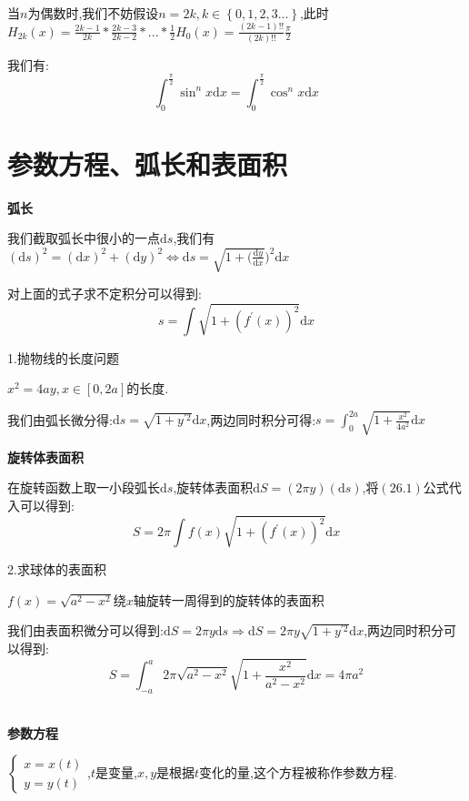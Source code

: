 \documentclass[oneside]{book}
\begin{document}
	\hspace{\fill}\
	
	当$n$为偶数时,我们不妨假设$n=2k,k\in\left\lbrace 0,1,2,3...\right\rbrace $,此时$H_{2k}(x)=\frac{2k-1}{2k}*\frac{2k-3}{2k-2}*...*\frac{1}{2}H_{0}(x)=\frac{(2k-1)!!}{(2k)!!}\frac{\pi}{2}$
	
	我们有:$$\int_{0}^{\frac{\pi}{2}}\sin^{n} x\mathrm{d}x=\int_{0}^{\frac{\pi}{2}}\cos^{n}x\mathrm{d}x$$
	
	\chapter{参数方程、弧长和表面积}
	\textbf{弧长}
	
	我们截取弧长中很小的一点$\mathrm{d}s$,我们有$(\mathrm{d}s)^{2}=(\mathrm{d}x)^{2}+(\mathrm{d}y)^{2}\Leftrightarrow \mathrm{d}s=\sqrt{1+(\frac{\mathrm{d}y}{\mathrm{d}x}})^{2}\mathrm{d}x$
	
	对上面的式子求不定积分可以得到:
	\begin{equation}
		s=\int\sqrt{1+(f^{'}(x))^{2}}\mathrm{d}x
	\end{equation}

	1.抛物线的长度问题
	
	$x^{2}=4ay,x\in [0,2a]$的长度.
	
	我们由弧长微分得:$\mathrm{d}s=\sqrt{1+y^{'2}}\mathrm{d}x$,两边同时积分可得:$s=\int_{0}^{2a}\sqrt{1+\frac{x^{2}}{4a^{2}}}\mathrm{d}x$
	\hspace{\fill}\
	
	\textbf{旋转体表面积}
	
	在旋转函数上取一小段弧长$\mathrm{d}s$,旋转体表面积$\mathrm{d}S=(2\pi y)(\mathrm{d}s)$,将$(26.1)$公式代入可以得到:
	\begin{equation}
		S=2\pi\int f(x)\sqrt{1+(f^{'}(x))^{2}}\mathrm{d}x 
	\end{equation}

	2.求球体的表面积
	
	$f(x)=\sqrt{a^{2}-x^{2}}$绕$x$轴旋转一周得到的旋转体的表面积
	
	我们由表面积微分可以得到:$\mathrm{d}S=2\pi y\mathrm{d}s\Rightarrow\mathrm{d}S=2\pi y\sqrt{1+y^{'2}}\mathrm{d}x$,两边同时积分可以得到:
	$$S=\int_{-a}^{a}2\pi \sqrt{a^{2}-x^{2}}\sqrt{1+\frac{x^{2}}{a^{2}-x^{2}}}\mathrm{d}x=4\pi a^{2}$$
	\hspace{\fill}\
	
	\textbf{参数方程}
	
	$\left\{\begin{array}{c}
		x=x(t)\\y=y(t)
	\end{array}\right.$,$t$是变量,$x,y$是根据$t$变化的量,这个方程被称作参数方程.
\end{document}
